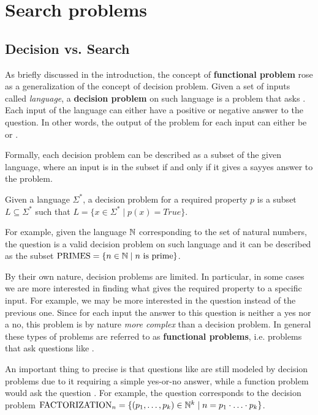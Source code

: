 
\chapter{Search problems} \label{chap:search_problems}

\section{Decision vs. Search}

As briefly discussed in the introduction, the concept of \textbf{functional problem} rose as a generalization of the concept of decision problem. Given a set of inputs called \textit{language}, a \textbf{decision problem} on such language is a problem that asks . Each input of the language can either have a positive or negative answer to the question. In other words, the output of the problem for each input can either be  or . 

Formally, each decision problem can be described as a subset of the given language, where an input is in the subset if and only if it gives a say{yes} answer to the problem.

\begin{definition}
    Given a language $\Sigma^*$, a decision problem for a required property $p$ is a subset $L \subseteq \Sigma^*$ such that $L = \{x \in \Sigma^* \mid p(x) = True\}$.
\end{definition}

For example, given the language $\mathbb{N}$ corresponding to the set of natural numbers, the question  is a valid decision problem on such language and it can be described as the subset $\mathrm{PRIMES} = \{n \in \mathbb{N} \mid n \text{ is prime}\}$.

By their own nature, decision problems are limited. In particular, in some cases we are more interested in finding what gives the required property to a specific input. For example, we may be more interested in the question  instead of the previous one. Since for each input the answer to this question is neither a yes nor a no, this problem is by nature \textit{more complex} than a decision problem. In general these types of problems are referred to as \textbf{functional problems}, i.e. problems that ask questions like . 

An important thing to precise is that questions like  are still modeled by decision problems due to it requiring a simple yes-or-no answer, while a function problem would ask the question . For example, the question  corresponds to the decision problem $\mathrm{FACTORIZATION}_n = \{(p_1, \ldots, p_k) \in \mathbb{N}^k \mid n = p_1 \cdot \ldots \cdot p_k\}$.

